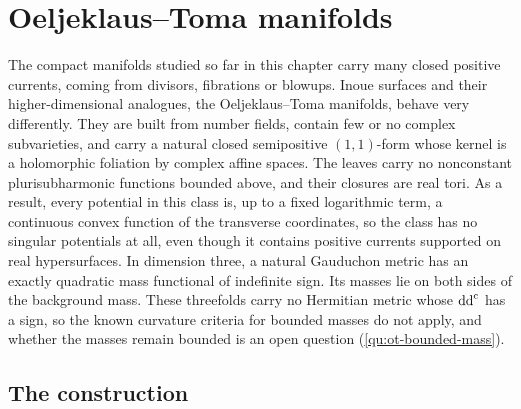 \section{Oeljeklaus--Toma manifolds}
\label{sec:oeljeklaus-toma}

The compact manifolds studied so far in this chapter carry many closed positive currents, coming from divisors, fibrations or blowups. Inoue surfaces and their higher-dimensional analogues, the Oeljeklaus--Toma manifolds, behave very differently. They are built from number fields, contain few or no complex subvarieties, and carry a natural closed semipositive $(1,1)$-form whose kernel is a holomorphic foliation by complex affine spaces. The leaves carry no nonconstant plurisubharmonic functions bounded above, and their closures are real tori. As a result, every potential in this class is, up to a fixed logarithmic term, a continuous convex function of the transverse coordinates, so the class has no singular potentials at all, even though it contains positive currents supported on real hypersurfaces. In dimension three, a natural Gauduchon metric has an exactly quadratic mass functional of indefinite sign. Its masses lie on both sides of the background mass. These threefolds carry no Hermitian metric whose $\mathrm{dd}^{\mathrm{c}}$ has a sign, so the known curvature criteria for bounded masses do not apply, and whether the masses remain bounded is an open question (\cref{qu:ot-bounded-mass}).

\subsection{The construction}

